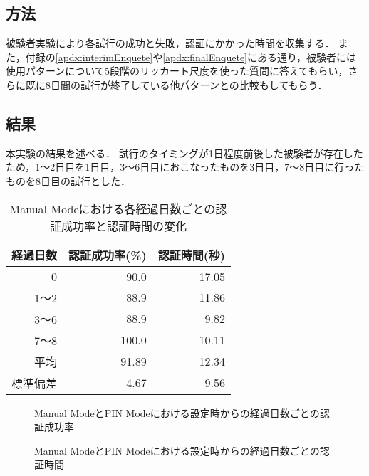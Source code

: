 \subsection{方法}
被験者実験により各試行の成功と失敗，認証にかかった時間を収集する．
また，付録の\ref{apdx:interimEnquete}や\ref{apdx:finalEnquete}にある通り，被験者には使用パターンについて5段階のリッカート尺度を使った質問に答えてもらい，さらに既に8日間の試行が終了している他パターンとの比較もしてもらう．

\subsection{結果}
本実験の結果を述べる．
試行のタイミングが1日程度前後した被験者が存在したため，1〜2日目を1日目，3〜6日目におこなったものを3日目，7〜8日目に行ったものを8日目の試行とした．
\begin{table}[ht]
  \begin{center}
    \small
    \begin{tabular}{|r|r|r|} \hline
      経過日数 & 認証成功率(\%) & 認証時間(秒)\\ \hline
      0 & 90.0 & 17.05 \\
      1〜2 & 88.9 & 11.86 \\
      3〜6 & 88.9 & 9.82 \\
      7〜8 & 100.0 & 10.11 \\ \hline \hline
      平均 & 91.89 & 12.34 \\
      標準偏差 & 4.67 & 9.56 \\ \hline
    \end{tabular}
  \end{center}
  \caption{Manual Modeにおける各経過日数ごとの認証成功率と認証時間の変化}
  \label{tab:manual.data}
\end{table}

\begin{figure}[ht]
  \begin{center}
  \end{center}
  \caption{Manual ModeとPIN Modeにおける設定時からの経過日数ごとの認証成功率}
  \label{fig:ex_manual_vs_pin_rate}
\end{figure}

\begin{figure}[ht]
  \begin{center}
  \end{center}
  \caption{Manual ModeとPIN Modeにおける設定時からの経過日数ごとの認証時間}
  \label{fig:ex_manual_vs_pin_time}
\end{figure}

